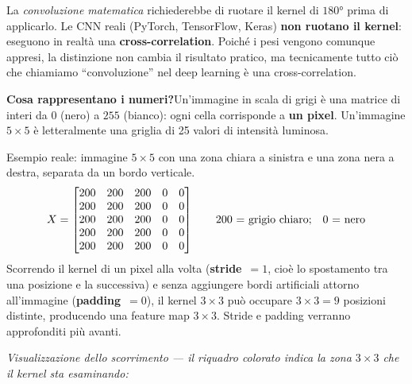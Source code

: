 \documentclass[
  11pt,
]{article}
\begin{document}
\begin{notabox}[title={\textbf{Convoluzione vs cross-correlation}}]
La \emph{convoluzione matematica} richiederebbe di ruotare il kernel di $180°$ prima di applicarlo. Le CNN reali (PyTorch, TensorFlow, Keras) \textbf{non ruotano il kernel}: eseguono in realtà una \textbf{cross-correlation}. Poiché i pesi vengono comunque appresi, la distinzione non cambia il risultato pratico, ma tecnicamente tutto ciò che chiamiamo ``convoluzione'' nel deep learning è una cross-correlation.
\end{notabox}

\medskip
\textbf{Cosa rappresentano i numeri?}\quad Un'immagine in scala di grigi è una matrice di interi da $0$ (nero) a $255$ (bianco): ogni cella corrisponde a \textbf{un pixel}. Un'immagine $5\times5$ è letteralmente una griglia di 25 valori di intensità luminosa.

Esempio reale: immagine $5\times5$ con una zona chiara a sinistra e una zona nera a destra, separata da un bordo verticale.
\[
X =
\begin{bmatrix}
200 & 200 & 200 & 0 & 0 \\
200 & 200 & 200 & 0 & 0 \\
200 & 200 & 200 & 0 & 0 \\
200 & 200 & 200 & 0 & 0 \\
200 & 200 & 200 & 0 & 0
\end{bmatrix}
\qquad \text{200 = grigio chiaro;\quad 0 = nero}
\]
Scorrendo il kernel di un pixel alla volta (\textbf{stride}~$= 1$, cioè lo spostamento tra una posizione e la successiva) e senza aggiungere bordi artificiali attorno all'immagine (\textbf{padding}~$= 0$), il kernel $3\times3$ può occupare $3\times3 = 9$ posizioni distinte, producendo una feature map $3\times3$. Stride e padding verranno approfonditi più avanti.

\medskip
\textit{Visualizzazione dello scorrimento — il riquadro colorato indica la zona $3\times3$ che il kernel sta esaminando:}
\end{document}
